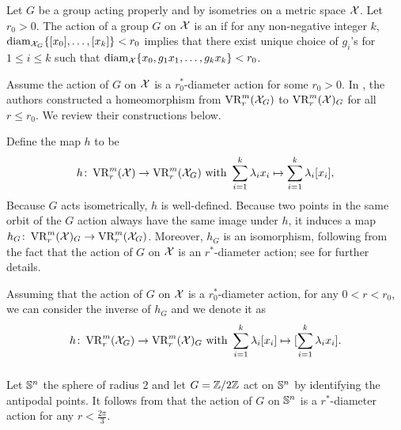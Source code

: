 
\subsubsection{}


Let $G$ be a group acting properly and by isometries on a metric space $\mathcal{X}$.
Let $r_0>0$. The action of a group $G$ on $\mathcal{X}$ is an  if for any non-negative integer $k$, $\operatorname{diam}_{\mathcal{X}_G}\{[x_0],\dots,[x_k]\}<r_0$ implies that there exist unique choice of $g_i$'s for $1\leq i\leq k$ such that $\operatorname{diam}_{\mathcal{X}}\{x_0,g_1x_1,\dots,g_kx_k\}<r_0$. 

Assume the action of $G$ on $\mathcal{X}$ is a $r_0^*$-diameter action for some $r_0> 0$.
In \cite[Proposition 3.5]{adams2022metric}, the authors constructed a homeomorphism from $\operatorname{VR}_r^m(\mathcal{X}_G)$ to $\operatorname{VR}_r^m(\mathcal{X})_G$ for all $r \leq r_0$.
We review their constructions below. 

Define the map $h$ to be
\[
h \colon \operatorname{VR}_r^m(\mathcal{X}) \to \operatorname{VR}_r^m(\mathcal{X}_G) 
\text{ with }
\sum_{i=1}^k \lambda_i x_i \mapsto \sum_{i=1}^k \lambda_i [x_i],
\]
Because $G$ acts isometrically, $h$ is well-defined.
Because two points in the same orbit of the $G$ action always have the same image under $h$, it induces a map $h_G \colon \operatorname{VR}_r^m(\mathcal{X})_G \to \operatorname{VR}_r^m(\mathcal{X}_G)$.
Moreover, $h_G$ is an isomorphism, following from the fact that the action of $G$ on $\mathcal{X}$ is an $r^*$-diameter action; see \cite[Proposition 3.5]{adams2022metric} for further details.

Assuming that the action of $G$ on $\mathcal{X}$ is a $r_0^*$-diameter action, for any $0<r<r_0$, we can consider the inverse of $h_G$ and we denote it as
\[
h \colon \operatorname{VR}_r^m(\mathcal{X}_G) \to \operatorname{VR}_r^m(\mathcal{X})_G
\text{ with }
\sum_{i=1}^k \lambda_i [x_i] \mapsto [\sum_{i=1}^k \lambda_i x_i].
\]


\subsubsection{}

Let $\mathbb{S}^n$ the sphere of radius $2$ and let $G=\mathbb{Z}/2\mathbb{Z}$ act on $\mathbb{S}^n$ by identifying the antipodal points.
It follows from \cite[Corollary]{adams2022metric} that the action of $G$ on $\mathbb{S}^n$ is a $r^*$-diameter action for any $r<\tfrac{2\pi}{3}$.

